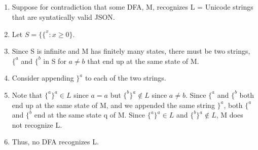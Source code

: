 \documentclass[11pt]{article}
\begin{document}
\subsection{} %
\begin{enumerate}
	\item Suppose for contradiction that some DFA, M, recognizes L = {Unicode strings that are syntatically valid JSON}.
	\item Let $S=\{\{^x:x\geq 0\}$.
	\item Since S is infinite and M has finitely many states, there must be two strings, $\{^a$ and $\{^b$ in S for $a \neq b$ that end up at the same state of M. 
	\item Consider appending $\}^a$ to each of the two strings. 
	\item Note that $\{^a\}^a \in L$ since $a=a$ but $\{^b\}^a \notin L$ since $a\neq b$. Since $\{^a$ and $\{^b$ both end up at the same state of M, and we appended the same string $\}^a$, both $\{^a$ and $\{^b$ end at the same state q of M. Since $\{^a\}^a \in L$ and $\{^b\}^a \notin L$, M does not recognize L. 
	\item Thus, no DFA recognizes L. 
\end{enumerate}
\end{document}
